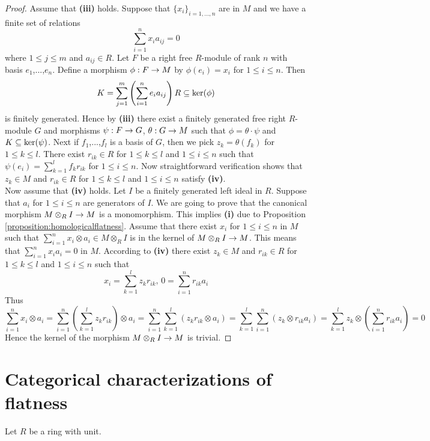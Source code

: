 \begin{proof}
Assume that \textbf{(iii)} holds. Suppose that $\{x_i\}_{i=1,...,n}$ are in $M$ and we have a finite set of relations
$$\sum^n_{i=1}x_ia_{ij}=0$$
where $1\leq j\leq m$ and $a_{ij}\in R$. Let $F$ be a right free $R$-module of rank $n$ with basis $e_1$,...,$e_n$. Define a morphism $\phi:F\rightarrow M$ by $\phi(e_i)=x_i$ for $1\leq i\leq n$. Then 
$$K=\sum_{j=1}^m\left(\sum_{i=1}^ne_ia_{ij}\right)R\subseteq \mathrm{ker}(\phi)$$
is finitely generated. Hence by \textbf{(iii)} there exist a finitely generated free right $R$-module $G$ and morphisms $\psi:F\rightarrow G$, $\theta:G\rightarrow M$ such that $\phi=\theta \cdot \psi$ and $K\subseteq \mathrm{ker}(\psi)$. Next if $f_1$,...,$f_l$ is a basis of $G$, then we pick $z_k=\theta(f_k)$ for $1\leq k\leq l$. There exist $r_{ik}\in R$ for $1\leq k\leq l$ and $1\leq i\leq n$ such that $\psi(e_i)=\sum_{k=1}^lf_kr_{ik}$ for $1\leq i\leq n$. Now straightforward verification shows that $z_k\in M$ and $r_{ik}\in R$ for $1\leq k\leq l$ and $1\leq i\leq n$ satisfy \textbf{(iv)}.\\
Now assume that \textbf{(iv)} holds. Let $I$ be a finitely generated left ideal in $R$. Suppose that $a_i$ for $1\leq i \leq n$ are generators of $I$. We are going to prove that the canonical morphism $M\otimes_RI\rightarrow M$ is a monomorphism. This implies \textbf{(i)} due to Proposition \ref{proposition:homologicalflatness}. Assume that there exist $x_i$ for $1\leq i\leq n$ in $M$ such that $\sum_{i=1}^nx_i\otimes a_i\in M\otimes_RI$ is in the kernel of $M\otimes_RI\rightarrow M$. This means that $\sum_{i=1}^nx_ia_i=0$ in $M$. According to \textbf{(iv)} there exist $z_k\in M$ and $r_{ik}\in R$ for $1\leq k\leq l$ and $1\leq i\leq n$ such that
$$x_i=\sum^l_{k=1}z_kr_{ik},\,0=\sum^n_{i=1}r_{ik}a_{i}$$
Thus
$$\sum_{i=1}^nx_i\otimes a_i=\sum_{i=1}^n\left(\sum_{k=1}^lz_kr_{ik}\right)\otimes a_i=\sum_{i=1}^n\sum_{k=1}^l\left(z_kr_{ik}\otimes a_i\right)=\sum_{k=1}^l\sum_{i=1}^n\left(z_k\otimes r_{ik}a_i\right)=\sum_{k=1}^lz_k\otimes \left(\sum_{i=1}^nr_{ik}a_i\right)=0$$
Hence the kernel of the morphism $M\otimes_RI\rightarrow M$ is trivial.
\end{proof}

\section{Categorical characterizations of flatness}
\noindent
Let $R$ be a ring with unit.

